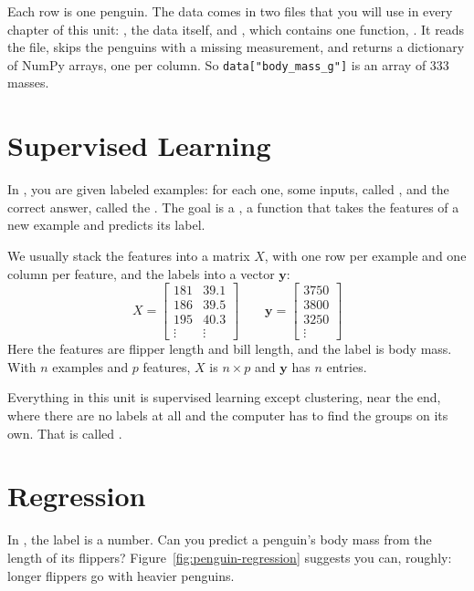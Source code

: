 Each row is one penguin. The data comes in two files that you will use in every chapter of this unit:
, the data itself, and , which contains one function,
. It reads the file, skips the penguins with a missing measurement, and returns a
dictionary of NumPy arrays, one per column. So \verb|data["body_mass_g"]| is an array of 333 masses.

\section{Supervised Learning}
In , you are given labeled examples: for each one, some inputs, called
, and the correct answer, called the . The goal
is a , a function that takes the features of a new example and predicts its
label.

We usually stack the features into a matrix $X$, with one row per example and one column per feature, and
the labels into a vector $\mathbf{y}$:
$$X = \begin{bmatrix} 181 & 39.1 \\ 186 & 39.5 \\ 195 & 40.3 \\ \vdots & \vdots \end{bmatrix}
\qquad
\mathbf{y} = \begin{bmatrix} 3750 \\ 3800 \\ 3250 \\ \vdots \end{bmatrix}$$
Here the features are flipper length and bill length, and the label is body mass. With $n$ examples and $p$
features, $X$ is $n \times p$ and $\mathbf{y}$ has $n$ entries.

Everything in this unit is supervised learning except clustering, near the end, where there are no labels
at all and the computer has to find the groups on its own. That is called
.

\section{Regression}
In , the label is a number. Can you predict a penguin's body mass from the length of
its flippers? Figure~\ref{fig:penguin-regression} suggests you can, roughly: longer flippers go with
heavier penguins.

